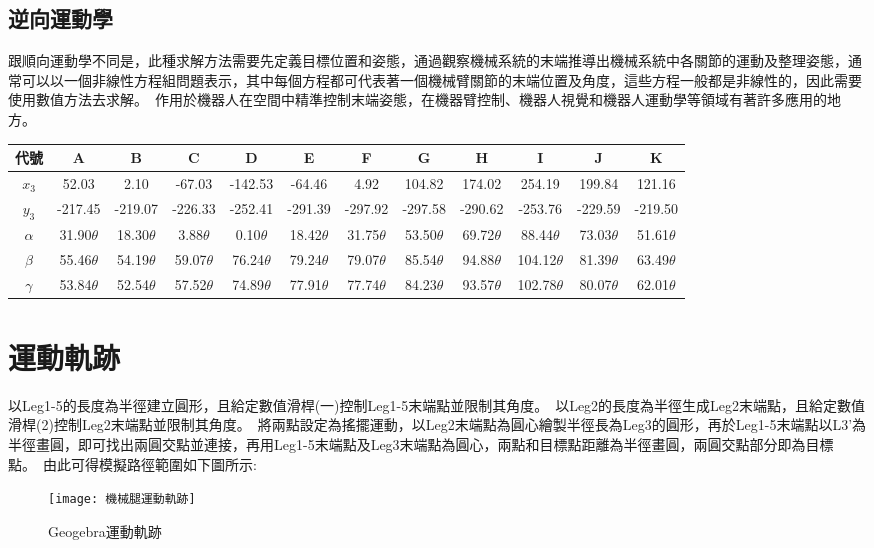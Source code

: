 \subsection{逆向運動學}
跟順向運動學不同是，此種求解方法需要先定義目標位置和姿態，通過觀察機械系統的末端推導出機械系統中各關節的運動及整理姿態，通常可以以一個非線性方程組問題表示，其中每個方程都可代表著一個機械臂關節的末端位置及角度，這些方程一般都是非線性的，因此需要使用數值方法去求解。\
作用於機器人在空間中精準控制末端姿態，在機器臂控制、機器人視覺和機器人運動學等領域有著許多應用的地方。\\

\begin{table}[htbp]
  \large
  \setlength{\tabcolsep}{0.7cm}
  \begin{tabular}{|c|c|c|c|c|c|c|c|c|c|c|c|}
    \hline
    代號 & A & B & C & D & E & F & G & H & I & J & K \\
    \hline
    $x_3$ & 52.03 & 2.10 & -67.03 & -142.53 & -64.46 & 4.92 & 104.82 & 174.02 & 254.19 & 199.84 & 121.16 \\
    \hline
    $y_3$ & -217.45 & -219.07 & -226.33 & -252.41 & -291.39 & -297.92 & -297.58 & -290.62 & -253.76 & -229.59 & -219.50 \\
    \hline
    $\alpha$ & 31.90$\theta$ & 18.30$\theta$ & 3.88$\theta$ & 0.10$\theta$ & 18.42$\theta$ & 31.75$\theta$ & 53.50$\theta$ & 69.72$\theta$ & 88.44$\theta$ & 73.03$\theta$ & 51.61$\theta$ \\
    \hline
    $\beta$ & 55.46$\theta$ & 54.19$\theta$ & 59.07$\theta$ & 76.24$\theta$ & 79.24$\theta$ & 79.07$\theta$ & 85.54$\theta$ & 94.88$\theta$ & 104.12$\theta$ & 81.39$\theta$ & 63.49$\theta$ \\
    \hline
    $\gamma$ & 53.84$\theta$ & 52.54$\theta$ & 57.52$\theta$ & 74.89$\theta$ & 77.91$\theta$ & 77.74$\theta$ & 84.23$\theta$ & 93.57$\theta$ & 102.78$\theta$ & 80.07$\theta$ & 62.01$\theta$ \\
    \hline
  \end{tabular}
\end{table}

\section{運動軌跡}
以Leg1-5的長度為半徑建立圓形，且給定數值滑桿(一)控制Leg1-5末端點並限制其角度。\
以Leg2的長度為半徑生成Leg2末端點，且給定數值滑桿(2)控制Leg2末端點並限制其角度。\
將兩點設定為搖擺運動，以Leg2末端點為圓心繪製半徑長為Leg3的圓形，再於Leg1-5末端點以L3’為半徑畫圓，即可找出兩圓交點並連接，再用Leg1-5末端點及Leg3末端點為圓心，兩點和目標點距離為半徑畫圓，兩圓交點部分即為目標點。\
由此可得模擬路徑範圍如下圖所示:\\
\begin{figure}[hbt!]
\begin{center}
\texttt{[image: 機械腿運動軌跡]}
\caption{\Large Geogebra運動軌跡}\label{機械腿運動軌跡}
\end{center}
\end{figure}
\newpage
